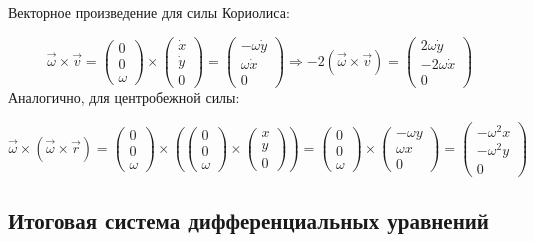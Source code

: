 \documentclass[a4paper,12pt]{article}
\begin{document}
Векторное произведение для силы Кориолиса:

\[
\vec{\omega} \times \vec{v} =
\begin{pmatrix}
0 \\ 0 \\ \omega
\end{pmatrix}
\times
\begin{pmatrix}
\dot{x} \\ \dot{y} \\ 0
\end{pmatrix}
=
\begin{pmatrix}
-\omega \dot{y} \\
\omega \dot{x} \\
0
\end{pmatrix}
\Rightarrow
-2(\vec{\omega} \times \vec{v}) =
\begin{pmatrix}
2\omega \dot{y} \\
-2\omega \dot{x} \\
0
\end{pmatrix}
\]
Аналогично, для центробежной силы:

\[
\vec{\omega} \times (\vec{\omega} \times \vec{r}) =
\begin{pmatrix}
0 \\ 0 \\ \omega
\end{pmatrix}
\times
\left(
\begin{pmatrix}
0 \\ 0 \\ \omega
\end{pmatrix}
\times
\begin{pmatrix}
x \\ y \\ 0
\end{pmatrix}
\right)
=
\begin{pmatrix}
0 \\ 0 \\ \omega
\end{pmatrix}
\times
\begin{pmatrix}
-\omega y \\
\omega x \\
0
\end{pmatrix}
=
\begin{pmatrix}
-\omega^2 x \\
-\omega^2 y \\
0
\end{pmatrix}
\]

\subsection{Итоговая система дифференциальных уравнений}
\end{document}
